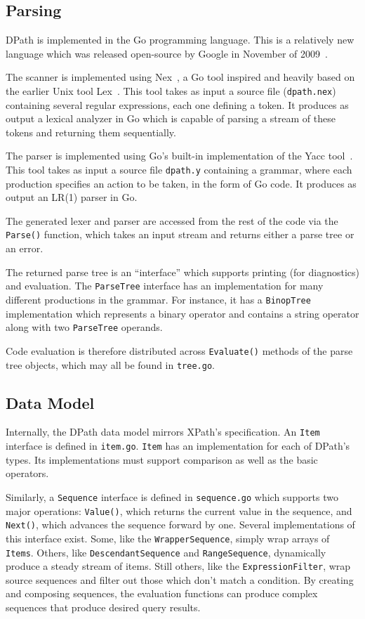 \documentclass{scrartcl}
\begin{document}
\subsection{Parsing}

DPath is implemented in the Go programming language. This is a relatively new
language which was released open-source by Google in November of
2009~\cite{golang}.

The scanner is implemented using Nex~\cite{nex}, a Go tool inspired and heavily
based on the earlier Unix tool Lex~\cite{lex}. This tool takes as input a source
file (\texttt{dpath.nex}) containing several regular expressions, each one
defining a token. It produces as output a lexical analyzer in Go which is
capable of parsing a stream of these tokens and returning them sequentially.

The parser is implemented using Go's built-in implementation of the Yacc
tool~\cite{yacc}. This tool takes as input a source file \texttt{dpath.y}
containing a grammar, where each production specifies an action to be taken, in
the form of Go code. It produces as output an LR(1) parser in Go.

The generated lexer and parser are accessed from the rest of the code via the
\texttt{Parse()} function, which takes an input stream and returns either a
parse tree or an error.

The returned parse tree is an ``interface'' which supports printing (for
diagnostics) and evaluation. The \texttt{ParseTree} interface has an
implementation for many different productions in the grammar. For instance, it
has a \texttt{BinopTree} implementation which represents a binary operator and
contains a string operator along with two \texttt{ParseTree} operands.

Code evaluation is therefore distributed across \texttt{Evaluate()} methods of
the parse tree objects, which may all be found in \texttt{tree.go}.

\subsection{Data Model}

Internally, the DPath data model mirrors XPath's specification. An \texttt{Item}
interface is defined in \texttt{item.go}. \texttt{Item} has an implementation
for each of DPath's types. Its implementations must support comparison as well
as the basic operators.

Similarly, a \texttt{Sequence} interface is defined in \texttt{sequence.go}
which supports two major operations: \texttt{Value()}, which returns the current
value in the sequence, and \texttt{Next()}, which advances the sequence forward
by one. Several implementations of this interface exist. Some, like the
\texttt{WrapperSequence}, simply wrap arrays of \texttt{Items}. Others, like
\texttt{DescendantSequence} and \texttt{RangeSequence}, dynamically produce a
steady stream of items. Still others, like the \texttt{ExpressionFilter}, wrap
source sequences and filter out those which don't match a condition. By creating
and composing sequences, the evaluation functions can produce complex sequences
that produce desired query results.
\end{document}
